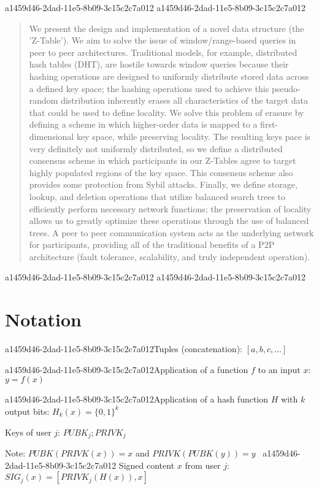 \documentclass[12pt]{article}
\begin{document}
\maketitle
a1459d46-2dad-11e5-8b09-3c15c2c7a012
a1459d46-2dad-11e5-8b09-3c15c2c7a012\begin{abstract}
We present the design and implementation of a novel data structure (the 'Z-Table'). We aim to solve the issue of window/range-based queries in peer to peer architectures. Traditional models, for example,  distributed hash tables (DHT), are hostile towards window queries because their hashing operations are designed to uniformly distribute stored data across a defined key space; the hashing operations used to achieve this pseudo-random distribution inherently erases all characteristics of the target data that could be used to define locality. We solve this problem of erasure by defining a scheme in which higher-order data is mapped to a first-dimensional key space, while preserving locality. The resulting keys pace is very definitely not uniformly distributed, so we define a distributed consensus scheme in which participants in our Z-Tables agree to target highly populated regions of the key space. This consensus scheme also provides some protection from Sybil attacks. Finally, we define storage, lookup, and deletion operations that utilize balanced search trees to efficiently perform necessary network functions; the preservation of locality allows us to greatly optimize these operations through the use of balanced trees. A peer to peer communication system acts as the underlying network for participants, providing all of the traditional benefits of a P2P architecture (fault tolerance, scalability, and truly independent operation).
\end{abstract}
a1459d46-2dad-11e5-8b09-3c15c2c7a012
a1459d46-2dad-11e5-8b09-3c15c2c7a012\section{Notation}

a1459d46-2dad-11e5-8b09-3c15c2c7a012Tuples (concatenation): $[a,b,c,...]$

a1459d46-2dad-11e5-8b09-3c15c2c7a012Application of a function $f$ to an input $x$: $y=f(x)$

a1459d46-2dad-11e5-8b09-3c15c2c7a012Application of a hash function $H$ with $k$ output bits: $H_{k}(x) = \{0,1\}^k$

Keys of user $j$: $ PUBK_j; PRIVK_j $

Note: $PUBK(PRIVK(x)) = x$ and $PRIVK(PUBK(y)) = y$~
a1459d46-2dad-11e5-8b09-3c15c2c7a012
Signed content $x$ from user $j$: $SIG_j(x) = \left[ PRIVK_j( H(x) ), x \right]$
\end{document}

